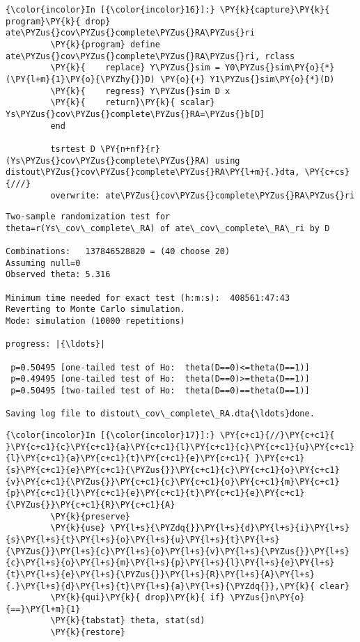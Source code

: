 \documentclass[11pt,notitlepage]{article}\usepackage[]{graphicx}\usepackage[]{color}
\makeatletter
\newenvironment{kframe}{%
 \def\at@end@of@kframe{}%
 \ifinner\ifhmode%
  \def\at@end@of@kframe{\end{minipage}}%
  \begin{minipage}{\columnwidth}%
 \fi\fi%
 \def\FrameCommand##1{\hskip\@totalleftmargin \hskip-\fboxsep
 \colorbox{shadecolor}{##1}\hskip-\fboxsep
     \hskip-\linewidth \hskip-\@totalleftmargin \hskip\columnwidth}%
 \MakeFramed {\advance\hsize-\width
   \@totalleftmargin\z@ \linewidth\hsize
   \@setminipage}}%
 {\par\unskip\endMakeFramed%
 \at@end@of@kframe}
\newenvironment{knitrout}{}{} %
\makeatother
\begin{document}
\begin{enumerate}[a)]
\begin{knitrout}
\begin{kframe}
    \begin{Verbatim}[commandchars=\\\{\}]
{\color{incolor}In [{\color{incolor}16}]:} \PY{k}{capture}\PY{k}{ program}\PY{k}{ drop} ate\PYZus{}cov\PYZus{}complete\PYZus{}RA\PYZus{}ri
         \PY{k}{program} define ate\PYZus{}cov\PYZus{}complete\PYZus{}RA\PYZus{}ri, rclass
         \PY{k}{	replace} Y\PYZus{}sim = Y0\PYZus{}sim\PY{o}{*}(\PY{l+m}{1}\PY{o}{\PYZhy{}}D) \PY{o}{+} Y1\PYZus{}sim\PY{o}{*}(D) 
         \PY{k}{	regress} Y\PYZus{}sim D x
         \PY{k}{    return}\PY{k}{ scalar} Ys\PYZus{}cov\PYZus{}complete\PYZus{}RA=\PYZus{}b[D]	
         end
         
         tsrtest D \PY{n+nf}{r}(Ys\PYZus{}cov\PYZus{}complete\PYZus{}RA) using distout\PYZus{}cov\PYZus{}complete\PYZus{}RA\PY{l+m}{.}dta, \PY{c+cs}{///}
         overwrite: ate\PYZus{}cov\PYZus{}complete\PYZus{}RA\PYZus{}ri
\end{Verbatim}

    \begin{Verbatim}[commandchars=\\\{\}]
Two-sample randomization test for 
theta=r(Ys\_cov\_complete\_RA) of ate\_cov\_complete\_RA\_ri by D

Combinations:   137846528820 = (40 choose 20)
Assuming null=0
Observed theta: 5.316

Minimum time needed for exact test (h:m:s):  408561:47:43
Reverting to Monte Carlo simulation.
Mode: simulation (10000 repetitions)

progress: |{\ldots}|

 p=0.50495 [one-tailed test of Ho:  theta(D==0)<=theta(D==1)]
 p=0.49495 [one-tailed test of Ho:  theta(D==0)>=theta(D==1)]
 p=0.50495 [two-tailed test of Ho:  theta(D==0)==theta(D==1)]

Saving log file to distout\_cov\_complete\_RA.dta{\ldots}done.

    \end{Verbatim}

    \begin{Verbatim}[commandchars=\\\{\}]
{\color{incolor}In [{\color{incolor}17}]:} \PY{c+c1}{//}\PY{c+c1}{ }\PY{c+c1}{c}\PY{c+c1}{a}\PY{c+c1}{l}\PY{c+c1}{c}\PY{c+c1}{u}\PY{c+c1}{l}\PY{c+c1}{a}\PY{c+c1}{t}\PY{c+c1}{e}\PY{c+c1}{ }\PY{c+c1}{s}\PY{c+c1}{e}\PY{c+c1}{\PYZus{}}\PY{c+c1}{c}\PY{c+c1}{o}\PY{c+c1}{v}\PY{c+c1}{\PYZus{}}\PY{c+c1}{c}\PY{c+c1}{o}\PY{c+c1}{m}\PY{c+c1}{p}\PY{c+c1}{l}\PY{c+c1}{e}\PY{c+c1}{t}\PY{c+c1}{e}\PY{c+c1}{\PYZus{}}\PY{c+c1}{R}\PY{c+c1}{A}
         \PY{k}{preserve}
         \PY{k}{use} \PY{l+s}{\PYZdq{}}\PY{l+s}{d}\PY{l+s}{i}\PY{l+s}{s}\PY{l+s}{t}\PY{l+s}{o}\PY{l+s}{u}\PY{l+s}{t}\PY{l+s}{\PYZus{}}\PY{l+s}{c}\PY{l+s}{o}\PY{l+s}{v}\PY{l+s}{\PYZus{}}\PY{l+s}{c}\PY{l+s}{o}\PY{l+s}{m}\PY{l+s}{p}\PY{l+s}{l}\PY{l+s}{e}\PY{l+s}{t}\PY{l+s}{e}\PY{l+s}{\PYZus{}}\PY{l+s}{R}\PY{l+s}{A}\PY{l+s}{.}\PY{l+s}{d}\PY{l+s}{t}\PY{l+s}{a}\PY{l+s}{\PYZdq{}},\PY{k}{ clear}
         \PY{k}{qui}\PY{k}{ drop}\PY{k}{ if} \PYZus{}n\PY{o}{==}\PY{l+m}{1}
         \PY{k}{tabstat} theta, stat(sd)
         \PY{k}{restore}
\end{Verbatim}


\end{kframe}
\end{knitrout}
\end{enumerate}
\end{document}
